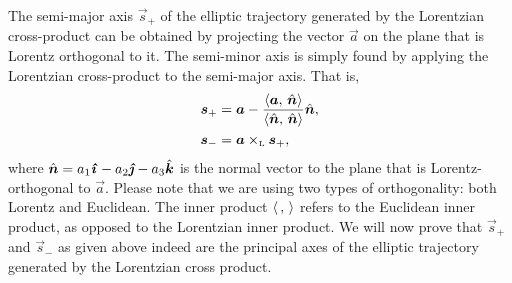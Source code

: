 The semi-major axis \(\vec{s}_+\) of the elliptic trajectory generated by the Lorentzian cross-product can be obtained by projecting the vector \(\vec{a}\) on the plane that is Lorentz orthogonal to it. The semi-minor axis is simply found by applying the Lorentzian cross-product to the semi-major axis. That is,
\begin{equation}
    \begin{split}
        \vec{s}_+ &= \vec{a} - \frac{ \inner{\vec{a}}{\uvec{n}} }{ \inner{\uvec{n}}{\uvec{n}} } \uvec{n}, \\
        \vec{s}_- &= \lorcrossp{\vec{a}}{\vec{s}_+}, \\
    \end{split}
    \label{eq:crossp_basis_vectors}
\end{equation}
where \(\uvec{n} = a_1\quati - a_2\quatj - a_3\quatk\) is the normal vector to the plane that is Lorentz-orthogonal to \(\vec{a}\). Please note that we are using two types of orthogonality: both Lorentz and Euclidean. The inner product \(\langle \,,\, \rangle\) refers to the Euclidean inner product, as opposed to the Lorentzian inner product. We will now prove that $\vec{s}_+$ and $\vec{s}_-$ as given above indeed are the principal axes of the elliptic trajectory generated by the Lorentzian cross product.

